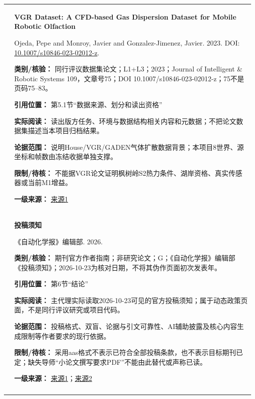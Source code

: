 \begin{longtable}{@{}>{\raggedright\arraybackslash}p{0.7cm}>{\raggedright\arraybackslash}p{14.8cm}@{}}
28 & \textbf{VGR Dataset: A CFD-based Gas Dispersion Dataset for Mobile Robotic Olfaction}\par Ojeda, Pepe and Monroy, Javier and Gonzalez-Jimenez, Javier. 2023. DOI: \url{10.1007/s10846-023-02012-z}. \par\textbf{类别/核验：} 同行评议数据集论文；L1+L3；2023；Journal of Intelligent \& Robotic Systems 109，文章号75；DOI 10.1007/s10846-023-02012-z；75不是页码75–83。\par\textbf{引用位置：} 第5.1节“数据来源、划分和读出资格”\par\textbf{实际阅读：} 读出版方任务、环境与数据结构相关内容和元数据；不把论文数据集描述当本项目归档结果。\par\textbf{论据范围：} 说明House/VGR/GADEN气体扩散数据背景；本项目8世界、源坐标和帧数由冻结收据单独支撑。\par\textbf{限制/待核：} 不能据VGR论文证明枫树岭S2热力条件、湖岸资格、真实传感器或当前M1增益。\par\textbf{一级来源：} \href{https://link.springer.com/article/10.1007/s10846-023-02012-z}{来源1} \\\addlinespace[6pt]
29 & \textbf{投稿须知}\par 《自动化学报》编辑部. 2026. \par\textbf{类别/核验：} 期刊官方作者指南；非研究论文；G；《自动化学报》编辑部《投稿须知》；2026-10-23为核对日期，不将其伪作页面初次发表年。\par\textbf{引用位置：} 第6节“结论”\par\textbf{实际阅读：} 主代理实际读取2026-10-23可见的官方投稿须知；属于动态政策页面，不是同行评议研究或项目代码。\par\textbf{论据范围：} 投稿格式、双盲、论据与引文可靠性、AI辅助披露及核心内容生成限制等作者要求的现行依据。\par\textbf{限制/待核：} 采用aas格式不表示已符合全部投稿条款，也不表示目标期刊已定；缺失导师“小论文撰写要求PDF”不能由此替代或声称已读。\par\textbf{一级来源：} \href{https://www.aas.net.cn/news/tgxz.htm}{来源1}；\href{https://www.aas.net.cn/news/lunwenmoban.htm}{来源2} \\\addlinespace[6pt]
\end{longtable}
\endgroup


